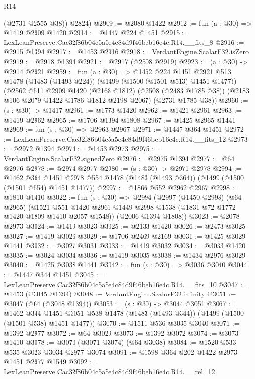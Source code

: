 \begin{lexlean}{R14}
\begin{coremodule}
        (@2731 @2555 @38))
      @2824)
@2909 := @2080 @1422
@2912 := fun (a : @30) => @1419 @2909 @1420
@2914 := @1447 @224 @1451
@2915 := LexLeanPreserve.Cac32f86b04c5a5e4c84d9f46beb16e4c.R14.__fits_8
@2916 := @2915 @1394
@2917 := @1453 @2916
@2918 := VerdantEngine.ScalarF32.isZero
@2919 := @2918 @1394
@2921 := @2917 (@2508 @2919)
@2923 := (a : @30) -> @2914 @2921
@2959 := fun (a : @30) =>
  @1462
    @224
    @1451
    @2921
    @513
    @1478
    (@1483 (@1493 @224))
    (@1499 (@1500 (@1501 @513) @1451 @1477))
    (@2562
      @511
      @2909
      @1420
      (@2168 @1812)
      (@2508 (@2483 @1785 @38))
      (@2183 @106 @2079 @1422 @1786 @1812 @2198 @2067)
      (@2731 @1785 @38))
@2960 := (s : @30) -> @1417
@2961 := @1773 @1420
@2962 := @1421 @2961
@2963 := @1419 @2962
@2965 := @1706 @1394 @1808
@2967 := @1425 @2965 @1441
@2969 := fun (s : @30) => @2963 @2967
@2971 := @1447 @364 @1451
@2972 := LexLeanPreserve.Cac32f86b04c5a5e4c84d9f46beb16e4c.R14.__fits_12
@2973 := @2972 @1394
@2974 := @1453 @2973
@2975 := VerdantEngine.ScalarF32.signedZero
@2976 := @2975 @1394
@2977 := @64 @2976
@2978 := @2974 @2977
@2980 := (s : @30) -> @2971 @2978
@2994 := @1462
    @364
    @1451
    @2978
    @554
    @1478
    (@1483 (@1493 @364))
    (@1499 (@1500 (@1501 @554) @1451 @1477))
@2997 := @1866 @552 @2962 @2967
@2998 := @1810 @1410
@3022 := fun (s : @30) =>
  @2994
    (@2997
      (@1450 @2998)
      (@64 @2965)
      (@1521 @551 @1420 @2961 @1449 @2998 @1538 (@1831 @72 @1772 @1420 @1809 @1410 @2057 @1548))
      (@2006 @1394 @1808))
@3023 := @2078 @2973
@3024 := @1419 @3023
@3025 := @2133 @1420
@3026 := @2473 @3025
@3027 := @1419 @3026
@3029 := @1706 @2469 @2169
@3031 := @1425 @3029 @1441
@3032 := @3027 @3031
@3033 := @1419 @3032
@3034 := @3033 @1420
@3035 := @3024 @3034
@3036 := @1419 @3035
@3038 := @1434 @2976 @3029
@3040 := @1425 @3038 @1441
@3042 := fun (s : @30) => @3036 @3040
@3044 := @1447 @344 @1451
@3045 := LexLeanPreserve.Cac32f86b04c5a5e4c84d9f46beb16e4c.R14.__fits_10
@3047 := @1453 (@3045 @1394)
@3048 := VerdantEngine.ScalarF32.infinity
@3051 := @3047 (@64 (@3048 @1394))
@3053 := (s : @30) -> @3044 @3051
@3067 := @1462
    @344
    @1451
    @3051
    @538
    @1478
    (@1483 (@1493 @344))
    (@1499 (@1500 (@1501 @538) @1451 @1477))
@3070 := @1511 @536 @3035 @3040
@3071 := @1392 @2977
@3072 := @64 @3029
@3073 := @1392 @3072
@3074 := @3073 @1410
@3078 := @3070 (@3071 @3074) (@64 @3038)
@3084 := @1520 @533 @535 @3023 @3034 @2977 @3074
@3091 := @1598 @364 @202 @1422 @2973 @1451 @2977 @1549
@3092 := LexLeanPreserve.Cac32f86b04c5a5e4c84d9f46beb16e4c.R14.__rel_12

\end{coremodule}
\end{lexlean}
